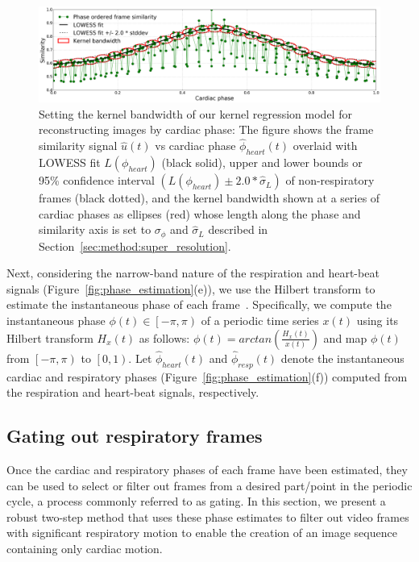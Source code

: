 \documentclass[journal]{IEEEtran}
\newcounter{lfigcounter}
\begin{document}
\begin{figure}[t]
\centering
\setcounter{lfigcounter}{1}
%
\includegraphics[width=7.0in]{figures/decoded/2015-07-27-10-36-06_2015-07-15-16-56-16_1.raw.bmode/phase_similarity_bandwidth.png}
%
\caption{Setting the kernel bandwidth of our kernel regression model for reconstructing images by cardiac phase: The figure shows the frame similarity signal $\hat{u}(t)$ vs cardiac phase $\hat{\phi}_{heart}(t)$ overlaid with LOWESS fit $L(\phi_{heart})$ (black solid), upper and lower bounds or 95\% confidence interval $(L(\phi_{heart}) \pm 2.0 * \hat{\sigma}_L)$ of non-respiratory frames (black dotted), and the kernel bandwidth shown at a series of cardiac phases as ellipses (red) whose length along the phase and similarity axis is set to $\sigma_\phi$ and $\hat{\sigma}_{L}$ described in Section~\ref{sec:method:super_resolution}.}
\label{fig:phase_similarity_bandwidth}
\end{figure}
%	

	Next, considering the narrow-band nature of the respiration and heart-beat signals (Figure~\ref{fig:phase_estimation}(e)), we use the Hilbert transform to estimate the instantaneous phase of each frame~\cite{Bracewell1986,Rosenblum2001,Freund2003,Kuklik2015}. Specifically, we compute the instantaneous phase $\phi(t) \in \left [  -\pi, \pi\right )$ of a periodic time series $x(t)$ using its Hilbert transform $H_x(t)$ as follows: $\phi(t) = arctan \left( \frac{H_x(t)}{x(t)}\right)$ and map $\phi(t)$ from $\left [  -\pi, \pi\right )$ to $\left [  0, 1\right )$. Let $\hat{\phi}_{heart}(t)$ and $\hat{\phi}_{resp}(t)$ denote the instantaneous cardiac and respiratory phases (Figure~\ref{fig:phase_estimation}(f)) computed from the respiration and heart-beat signals, respectively.
%
\subsection{Gating out respiratory frames}
\label{sec:method:gating}
%
Once the cardiac and respiratory phases of each frame have been estimated, they can be used to select or filter out frames from a desired part/point in the periodic cycle, a process commonly referred to as gating. In this section, we present a robust two-step method that uses these phase estimates to filter out video frames with significant respiratory motion to enable the creation of an image sequence containing only cardiac motion.
\end{document}
